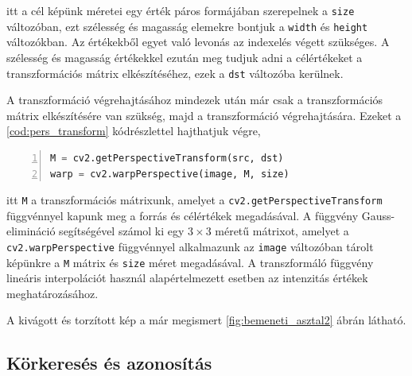 \par itt a cél képünk méretei egy érték páros formájában szerepelnek a \lstinline{size} változóban, ezt szélesség és magasság elemekre bontjuk a \lstinline{width} és \lstinline{height} változókban. Az értékekből egyet való levonás az indexelés végett szükséges. A szélesség és magasság értékekkel ezután meg tudjuk adni a célértékeket a transzformációs mátrix elkészítéséhez, ezek a \lstinline{dst} változóba kerülnek.
\par A transzformáció végrehajtásához mindezek után már csak a transzformációs mátrix elkészítésére van szükség, majd a transzformáció végrehajtására.
\newline Ezeket a \ref{cod:pers_transform} kódrészlettel hajthatjuk végre,

\vspace{2mm}
\hspace{-10mm}
\begin{minipage}{\linewidth}
\begin{lstlisting}[language=Python, numbers=left, caption={A transzformáció végrehajtása.}, label={cod:pers_transform}]
M = cv2.getPerspectiveTransform(src, dst)
warp = cv2.warpPerspective(image, M, size)
\end{lstlisting}
\end{minipage}

\par itt \lstinline{M} a transzformációs mátrixunk, amelyet a \lstinline{cv2.getPerspectiveTransform} függvénnyel \cite{cv2_get_perspective_transform} kapunk meg a forrás és célértékek megadásával. A függvény Gauss-elimináció \cite{grcar2011mathematicians} segítségével számol ki egy $3\times3$ méretű mátrixot, amelyet a \lstinline{cv2.warpPerspective} függvénnyel \cite{cv2_warp_perspective} alkalmazunk az \lstinline{image} változóban tárolt képünkre a \lstinline{M} mátrix és \lstinline{size} méret megadásával. A transzformáló függvény lineáris interpolációt \cite{blu0401interpolation} használ alapértelmezett esetben az intenzitás értékek meghatározásához.
\par A kivágott és torzított kép a már megismert \ref{fig:bemeneti_asztal2} ábrán látható.

\subsection{Körkeresés és azonosítás}